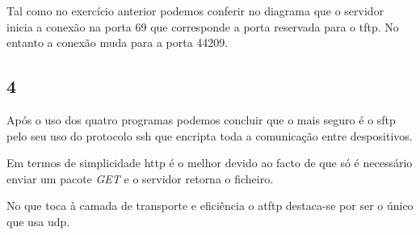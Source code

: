 \documentclass{article}
\begin{document}
            Tal como no exercício anterior podemos conferir no diagrama que o servidor inicia a conexão na porta 69 que corresponde a porta reservada para o tftp. No entanto a conexão muda para a porta 44209.
        \subsection*{4}
                Após o uso dos quatro programas podemos concluir que o mais seguro é o sftp pelo seu uso do protocolo ssh que encripta toda a comunicação entre despositivos.

                Em termos de simplicidade http é o melhor devido ao facto de que só é necessário enviar um pacote \textit{GET} e o servidor retorna o ficheiro.

                No que toca à camada de transporte e eficiência o atftp destaca-se por ser o único que usa udp.
\end{document}
